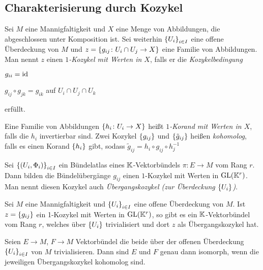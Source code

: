 \subsection*{Charakterisierung durch Kozykel}

\begin{definition}
  Sei $M$ eine Mannigfaltigkeit und $X$ eine Menge von Abbildungen,
  die abgeschlossen unter Komposition ist.
  Sei weiterhin $\left\lbrace U_i \right\rbrace_{i\in I}$ eine offene
  Überdeckung von $M$ und $z = \left\lbrace  g_{ij} \colon U_i\cap U_j \to X \right\rbrace$
  eine Familie von Abbildungen. Man nennt $z$ einen
  \emph{$1$-Kozykel mit Werten in $X$}, falls er die \emph{Kozykelbedingung}
  \begin{statements}
  \item $g_{ii} = \operatorname{id}$
  \item $g_{ij} \circ g_{jk} = g_{ik}$ auf $U_i\cap U_j\cap U_k$
  \end{statements}
  erfüllt.

  Eine Familie von Abbildungen $\left\lbrace h_i\colon U_i \to X \right\rbrace$ heißt
  \emph{$1$-Korand mit Werten in $X$}, falls die $h_i$ invertierbar
  sind. Zwei Kozykel $\left\lbrace g_{ij} \right\rbrace$ und
  $\left\lbrace \tilde{g}_{ij} \right\rbrace$ heißen \emph{kohomolog}, falls es einen
  Korand $\left\lbrace h_i \right\rbrace$ gibt, sodass $\tilde{g}_{ij} = h_i \circ g_{ij}
  \circ h_j^{-1}$ 
\end{definition}

\begin{proposition}
  Sei $\left\lbrace (U_i,\Phi_i) \right\rbrace_{i\in I}$ ein Bündelatlas eines $\mathbb{K}$-Vektorbündels
  $\pi\colon E \to M$ vom Rang $r$. Dann bilden die Bündelübergänge $g_{ij}$ einen
  $1$-Kozykel mit Werten in $\operatorname{GL}(\mathbb{K}^r)$. Man nennt diesen Kozykel auch
  \emph{Übergangskozykel (zur Überdeckung $\left\lbrace U_i \right\rbrace$)}.
\end{proposition}

\begin{proposition}
  Sei $M$ eine Mannigfaltigkeit und $\left\lbrace U_i \right\rbrace_{i\in I}$ eine offene
  Überdeckung von $M$. Ist $z = \left\lbrace g_{ij} \right\rbrace$ ein 1-Kozykel mit Werten
  in $\operatorname{GL}(\mathbb{K}^r)$, so gibt es ein $\mathbb{K}$-Vektorbündel vom Rang $r$,
  welches über $\left\lbrace U_i \right\rbrace$ trivialisiert und dort $z$ als
  Übergangskozykel hat.
\end{proposition}

\begin{proposition}
  Seien $E\to M$, $F\to M$ Vektorbündel die beide über der offenen
  Überdeckung $\left\lbrace U_i \right\rbrace_{i\in I}$ von $M$ trivialisieren. Dann sind $E$ und $F$ genau
  dann isomorph, wenn die jeweiligen Übergangskozykel kohomolog sind.
\end{proposition}

